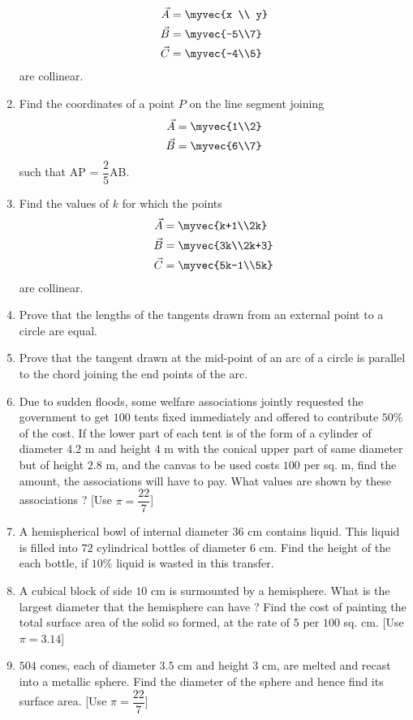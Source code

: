 \begin{enumerate}
\begin{align*}
\vec{A}&=\myvec{x \\ y}\\ 
\vec{B}&=\myvec{-5\\7}\\
\vec{C}&=\myvec{-4\\5} 
\end{align*}
are collinear.
\item Find the coordinates of a point $P$ on the line segment joining
\begin{align*}
\vec{A} &= \myvec{1\\2}\\
\vec{B} &= \myvec{6\\7}
\end{align*}
such that AP = $\dfrac{2}{5}$AB.
\item Find the values of $k$ for which the points
\begin{align*}
\vec{A} &= \myvec{k+1\\2k}\\
\vec{B} &= \myvec{3k\\2k+3}\\
\vec{C} &= \myvec{5k-1\\5k}
\end{align*}
are collinear.
\item Prove that the lengths of the tangents drawn from an external point to a circle are equal.
\item Prove that the tangent drawn at the mid-point of an arc of a circle is parallel to the chord joining the end points of the arc.
\item Due to sudden floods, some welfare associations jointly requested the government to get $100$ tents fixed immediately and offered to contribute $ 50\% $ of the cost. If the lower part of each tent is of the form of a cylinder of diameter $4.2$ m and height $4$ m with the conical upper part of same diameter but of height $2.8$ m, and the canvas to be used costs \rupee $100$ per sq. m, find the amount, the associations will have to pay. What values are shown by these associations ? [Use $\pi=\dfrac{22}{7}$]
\item A hemispherical bowl of internal diameter $36$ cm contains liquid. This liquid is filled into $72$ cylindrical bottles of diameter $6$ cm. Find the height of the each bottle, if $10 \% $ liquid is wasted in this transfer.
\item A cubical block of side $10$ cm is surmounted by a hemisphere. What is the largest diameter that the hemisphere can have ? Find the cost of painting the total surface area of the solid so formed, at the rate of \rupee $5$ per $100$ sq. cm. [Use $\pi= 3.14$]
\item $504$ cones, each of diameter $3.5$ cm and height $3$ cm, are melted and recast into a metallic sphere. Find the diameter of the sphere and hence find its surface area. [Use $\pi=\dfrac{22}{7}$]



\end{enumerate}
